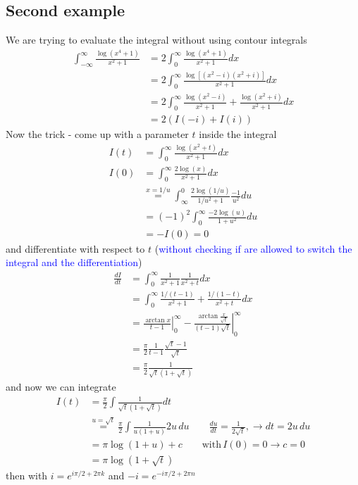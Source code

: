 \documentclass[../main.tex]{subfiles}
\begin{document}
\subsection{Second example}
We are trying to evaluate the integral without using contour integrals
\begin{align}
\int_{-\infty}^{\infty}\frac{\log(x^4+1)}{x^2+1}
&=2\int_0^{\infty}\frac{\log(x^4+1)}{x^2+1}dx\\
&=2\int_0^{\infty}\frac{\log[(x^2-i)(x^2+i)]}{x^2+1}dx\\
&=2\int_0^{\infty}\frac{\log(x^2-i)}{x^2+1}+\frac{\log(x^2+i)}{x^2+1}dx\\
&=2\left(I(-i)+I(i)\right)
\end{align}
Now the trick - come up with a parameter $t$ inside the integral
\begin{align}
I(t)&=\int_0^{\infty}\frac{\log(x^2+t)}{x^2+1}dx\\
I(0)&=\int_0^{\infty}\frac{2\log(x)}{x^2+1}dx\\
&\overset{x=1/u}{=}\int_\infty^0\frac{2\log(1/u)}{1/u^2+1}\frac{-1}{u^2}du\\
&=(-1)^2\int_0^{\infty}\frac{-2\log(u)}{1+u^2}du\\
&=-I(0)=0
\end{align}
and differentiate with respect to $t$ (\textcolor{blue}{without checking if are allowed to switch the integral and the differentiation})
\begin{align}
\frac{dI}{dt}
&=\int_0^{\infty}\frac{1}{x^2+1}\frac{1}{x^2+t}dx\\
&=\int_0^{\infty}\frac{1/(t-1)}{x^2+1}+\frac{1/(1-t)}{x^2+t}dx\\
&=\left.\frac{\arctan x}{t-1}\right|_0^\infty-\left.\frac{\arctan \frac{x}{\sqrt{t}}}{(t-1)\sqrt{t}}\right|_0^\infty\\
&=\frac{\pi}{2}\frac{1}{t-1}\frac{\sqrt{t}-1}{\sqrt{t}}\\
&=\frac{\pi}{2}\frac{1}{\sqrt{t}(1+\sqrt{t})}
\end{align}
and now we can integrate
\begin{align}
I(t)
&=\frac{\pi}{2}\int\frac{1}{\sqrt{t}(1+\sqrt{t})}dt\\
&\overset{u=\sqrt{t}}{=}\frac{\pi}{2}\int\frac{1}{u(1+u)}2u\,du\qquad\frac{du}{dt}=\frac{1}{2\sqrt{t}},\rightarrow dt=2u\,du\\
&=\pi\log(1+u)+c\qquad\text{with}\,I(0)=0\rightarrow c=0\\
&=\pi\log(1+\sqrt{t})
\end{align}
then with $i=e^{i\pi/2+2\pi k}$ and $-i=e^{-i\pi/2+2\pi n}$
\end{document}
